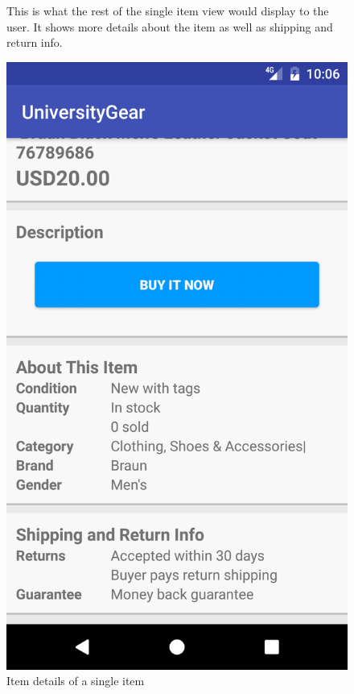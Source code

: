 \documentclass[journal,compsoc, 10pt, draftclsnofoot, onecolumn]{IEEEtran}
\begin{document}
\begin{figure}[t]
This is what the rest of the single item view would display to the user. It 
shows more details about the item as well as shipping and return info.
\centering
\caption{Item details of a single item}
\includegraphics[scale=.2]{singleview2}
\end{figure}
\FloatBarrier
\end{document}
